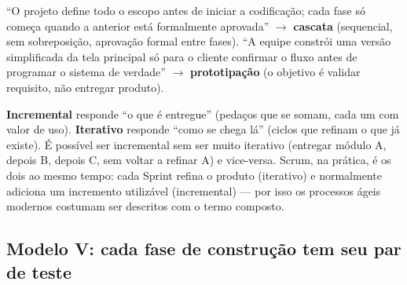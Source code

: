 \begin{exemplo}
“O projeto define todo o escopo antes de iniciar a codificação; cada fase
só começa quando a anterior está formalmente aprovada” $\to$ \textbf{cascata}
(sequencial, sem sobreposição, aprovação formal entre fases). “A equipe
constrói uma versão simplificada da tela principal só para o cliente
confirmar o fluxo antes de programar o sistema de verdade” $\to$
\textbf{prototipação} (o objetivo é validar requisito, não entregar
produto).
\end{exemplo}

\begin{cuidado}
\textbf{Incremental} responde “o que é entregue” (pedaços que se somam,
cada um com valor de uso). \textbf{Iterativo} responde “como se chega lá”
(ciclos que refinam o que já existe). É possível ser incremental sem ser
muito iterativo (entregar módulo A, depois B, depois C, sem voltar a
refinar A) e vice-versa. Scrum, na prática, é os dois ao mesmo tempo: cada
Sprint refina o produto (iterativo) e normalmente adiciona um incremento
utilizável (incremental) --- por isso os processos ágeis modernos costumam
ser descritos com o termo composto.
\end{cuidado}

\subsection{Modelo V: cada fase de construção tem seu par de teste}

